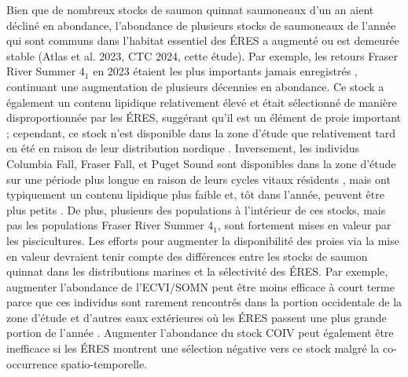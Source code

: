 Bien que de nombreux stocks de saumon quinnat saumoneaux d'un an aient décliné en abondance, l'abondance de plusieurs stocks de saumoneaux de l'année qui sont communs dans l'habitat essentiel des ÉRES a augmenté ou est demeurée stable (Atlas et al. 2023, CTC 2024, cette étude)\nocite{atlasTrendsChinookSalmon2023,ctcAnnualReportCatch2024a}. Par exemple, les retours Fraser River Summer $4_1$ en 2023 étaient les plus importants jamais enregistrés \citep{ctcAnnualReportCatch2024a}, continuant une augmentation de plusieurs décennies en abondance. Ce stock a également un contenu lipidique relativement élevé et était sélectionné de manière disproportionnée par les ÉRES, suggérant qu'il est un élément de proie important ; cependant, ce stock n'est disponible dans la zone d'étude que relativement tard en été en raison de leur distribution nordique \citep{weitkampMarineDistributionsChinook2010, freshwaterIntegratedModelSeasonal2021, ctc2021AnnualReport2022}. Inversement, les individus Columbia Fall, Fraser Fall, et Puget Sound sont disponibles dans la zone d'étude sur une période plus longue en raison de leurs cycles vitaux résidents \citep{weitkampMarineDistributionsChinook2010, sheltonUsingHierarchicalModels2019, freshwaterIntegratedModelSeasonal2021}, mais ont typiquement un contenu lipidique plus faible et, tôt dans l'année, peuvent être plus petits \citep{oneillEnergyContentPacific2014, lernerSeasonalVariationLipid2023, freshwaterSeasonalVariabilityCondition2024}. De plus, plusieurs des populations à l'intérieur de ces stocks, mais pas les populations Fraser River Summer $4_1$, sont fortement mises en valeur par les piscicultures. Les efforts pour augmenter la disponibilité des proies via la mise en valeur devraient tenir compte des différences entre les stocks de saumon quinnat dans les distributions marines et la sélectivité des ÉRES. Par exemple, augmenter l'abondance de l'ECVI/SOMN peut être moins efficace à court terme parce que ces individus sont rarement rencontrés dans la portion occidentale de la zone d'étude et d'autres eaux extérieures où les ÉRES passent une plus grande portion de l'année \citep{stewartTraditionalSummerHabitat2023}. Augmenter l'abondance du stock COIV peut également être inefficace si les ÉRES montrent une sélection négative vers ce stock malgré la co-occurrence spatio-temporelle.

